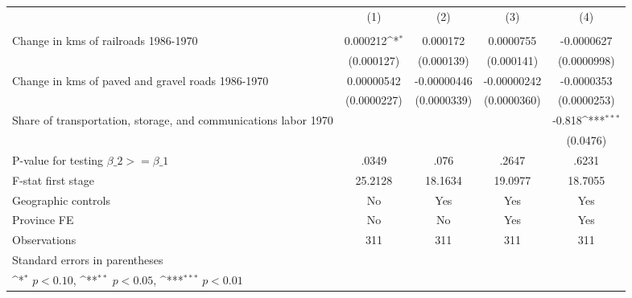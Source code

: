 {
\def\sym#1{\ifmmode^{#1}\else\(^{#1}\)\fi}
\begin{tabular}{l*{4}{c}}
\hline\hline
                &\multicolumn{1}{c}{(1)}&\multicolumn{1}{c}{(2)}&\multicolumn{1}{c}{(3)}&\multicolumn{1}{c}{(4)}\\
                &\multicolumn{1}{c}{}&\multicolumn{1}{c}{}&\multicolumn{1}{c}{}&\multicolumn{1}{c}{}\\
\hline
Change in kms of railroads 1986-1970& 0.000212\sym{*}  & 0.000172         &0.0000755         &-0.0000627         \\
                &(0.000127)         &(0.000139)         &(0.000141)         &(0.0000998)         \\
[1em]
Change in kms of paved and gravel roads 1986-1970&0.00000542         &-0.00000446         &-0.00000242         &-0.0000353         \\
                &(0.0000227)         &(0.0000339)         &(0.0000360)         &(0.0000253)         \\
[1em]
Share of transportation, storage, and communications labor 1970&                  &                  &                  &   -0.818\sym{***}\\
                &                  &                  &                  & (0.0476)         \\
\hline
P-value for testing $\beta\_{2} >= \beta\_{1}$&    .0349         &     .076         &    .2647         &    .6231         \\
F-stat first stage&  25.2128         &  18.1634         &  19.0977         &  18.7055         \\
Geographic controls&       No         &      Yes         &      Yes         &      Yes         \\
Province FE     &       No         &       No         &      Yes         &      Yes         \\
Observations    &      311         &      311         &      311         &      311         \\
\hline\hline
\multicolumn{5}{l}{\footnotesize Standard errors in parentheses}\\
\multicolumn{5}{l}{\footnotesize \sym{*} \(p<0.10\), \sym{**} \(p<0.05\), \sym{***} \(p<0.01\)}\\
\end{tabular}
}
